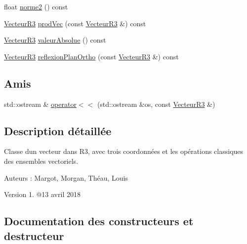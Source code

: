 \begin{DoxyCompactItemize}
\item 
float \mbox{\hyperlink{class_vecteur_r3_a6c8bbc72999a06fd23e4213729f585b2}{norme2}} () const
\item 
\mbox{\hyperlink{class_vecteur_r3}{Vecteur\+R3}} \mbox{\hyperlink{class_vecteur_r3_a4fa29ea43737c79245a9ba049308d90b}{prod\+Vec}} (const \mbox{\hyperlink{class_vecteur_r3}{Vecteur\+R3}} \&) const
\item 
\mbox{\hyperlink{class_vecteur_r3}{Vecteur\+R3}} \mbox{\hyperlink{class_vecteur_r3_a9cef6d7525f81938e2a7e71aa73c442c}{valeur\+Absolue}} () const
\item 
\mbox{\hyperlink{class_vecteur_r3}{Vecteur\+R3}} \mbox{\hyperlink{class_vecteur_r3_a8191355529fdc2c4fa22cad27d6ad305}{reflexion\+Plan\+Ortho}} (const \mbox{\hyperlink{class_vecteur_r3}{Vecteur\+R3}} \&) const
\end{DoxyCompactItemize}
\subsection*{Amis}
\begin{DoxyCompactItemize}
\item 
std\+::ostream \& \mbox{\hyperlink{class_vecteur_r3_a1ef8b2a2f31c15f4f7765caad34796ca}{operator$<$$<$}} (std\+::ostream \&os, const \mbox{\hyperlink{class_vecteur_r3}{Vecteur\+R3}} \&)
\end{DoxyCompactItemize}


\subsection{Description détaillée}
Classe d\textquotesingle{}un vecteur dans R3, avec trois coordonnées et les opérations classiques des ensembles vectoriels. \begin{DoxyAuthor}{Auteurs}
\+: Margot, Morgan, Théau, Louis 
\end{DoxyAuthor}
\begin{DoxyVersion}{Version}
1. @13 avril 2018 
\end{DoxyVersion}


\subsection{Documentation des constructeurs et destructeur}
\mbox{\label{class_vecteur_r3_a265cb675642abf1db0fbd99eed4590e7}} 
